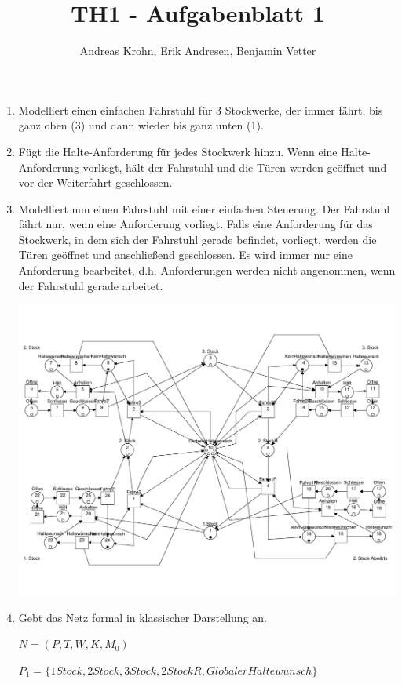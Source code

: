 \documentclass{report}
\title{TH1 - Aufgabenblatt 1}
\author{Andreas Krohn, Erik Andresen, Benjamin Vetter}
\begin{document}
\maketitle

\begin{enumerate}
\item Modelliert einen einfachen Fahrstuhl für 3 Stockwerke, der immer fährt, bis ganz oben (3) und dann wieder bis ganz unten (1).

\item Fügt die Halte-Anforderung für jedes Stockwerk hinzu. Wenn eine Halte-Anforderung vorliegt, hält der Fahrstuhl und die Türen werden geöffnet und vor der Weiterfahrt geschlossen.

\item Modelliert nun einen Fahrstuhl mit einer einfachen Steuerung. Der Fahrstuhl fährt nur, wenn eine Anforderung vorliegt. Falls eine Anforderung für das Stockwerk, in dem sich der Fahrstuhl gerade befindet, vorliegt, werden die Türen geöffnet und anschließend geschlossen. Es wird immer nur eine Anforderung bearbeitet, d.h. Anforderungen werden nicht angenommen, wenn der Fahrstuhl gerade arbeitet.

\includegraphics[width=1\textwidth]{prak_aufg3_fertig.pdf}

\item Gebt das Netz formal in klassischer Darstellung an.

$N = (P, T, W, K, M_0)$

$P_1 = \{ 1Stock, 2Stock, 3Stock, 2StockR, GlobalerHaltewunsch \}$


\end{enumerate}
\end{document}

